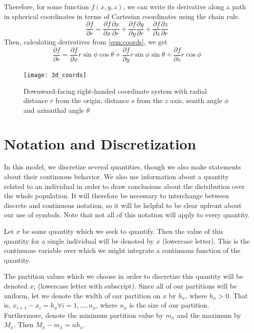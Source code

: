 \documentclass[10pt]{article}
\begin{document}
\begin{multicols}{2}
Therefore, for some function $f(x,y,z)$, we can write its derivative along a path in spherical coordinates in terms of Cartesian coordinates using the chain rule.
\begin{equation}
	\frac{\partial f}{\partial r} 
	=\frac{\partial f}{\partial x}\frac{\partial x}{\partial r} 
	+ \frac{\partial f}{\partial y}\frac{\partial y}{\partial r} 
	+ \frac{\partial f}{\partial z}\frac{\partial z}{\partial r}
\end{equation}
Then, calculating derivatives from \eqref{eqn:coords}, we get
\begin{equation}
	\frac{\partial f}{\partial r} 
	=\frac{\partial f}{\partial x}r\sin\phi\cos\theta
	+ \frac{\partial f}{\partial y}r\sin\phi\sin\theta
	+ \frac{\partial f}{\partial z}r\cos\phi
	\label{eqn:partials}
\end{equation}
\begin{figure}[H]
	\centering
	\texttt{[image: 3d\_coords]}
	\caption{Downward-facing right-handed coordinate system with radial distance $r$ from the origin, distance $s$ from the $z$ axis, zenith angle $\phi$ and azimuthal angle $\theta$}
	\label{fig:3dcoords}
\end{figure}

\section{Notation and Discretization}
In this model, we discretize several quantities, though we also make statements about their continuous behavior.
We also use information about a quantity related to an individual in order to draw conclusions about the distribution over the whole population.
It will therefore be necessary to interchange between discrete and continuous notation, so it will be helpful to be clear upfront about our use of symbols.
Note that not all of this notation will apply to every quantity.

Let $x$ be some quantity which we seek to quantify.
Then the value of this quantity for a single individual will be denoted by $x$ (lowercase letter).
This is the continuous variable over which we might integrate a continuous function of the quantity.

The partition values which we choose in order to discretize this quantity will be denoted $x_i$ (lowercase letter with subscript).
Since all of our partitions will be uniform, let we denote the width of our partition on $x$ by $h_x$, where $h_x>0$.
That is, $x_{i+1} - x_i = h_x \forall i = 1,\ldots,n_x$, where $n_x$ is the size of our partition.
Furthermore, denote the minimum partition value by $m_x$ and the maximum by $M_x$.
Then $M_x - m_x = nh_x$.


\end{multicols}
\end{document}
